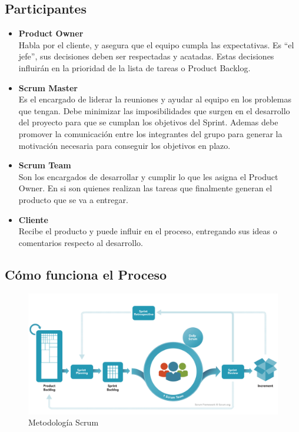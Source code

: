\subsection{Participantes}
\begin{itemize}
\item \textbf{Product Owner}\\
Habla por el cliente, y asegura que el equipo cumpla las expectativas. Es “el jefe”, sus decisiones deben ser
respectadas y acatadas. Estas  decisiones influirán en la prioridad de la lista de tareas o Product Backlog.



\item \textbf{Scrum Master}\\
Es el encargado de liderar la reuniones y ayudar al equipo en los problemas que tengan. Debe minimizar las imposibilidades que surgen en el desarrollo del proyecto para que se cumplan los objetivos del Sprint. Ademas debe promover la comunicación entre los integrantes del grupo para generar la motivación necesaria para conseguir los objetivos en plazo.




\item  \textbf{Scrum Team}\\
Son los encargados de desarrollar y cumplir lo que les asigna el Product Owner. En si son quienes realizan las tareas que finalmente generan el producto que se va a entregar.


\item  \textbf{Cliente}\\
Recibe el producto y puede influir en el proceso, entregando sus ideas o comentarios respecto al desarrollo.
\end{itemize}

\subsection{Cómo funciona el Proceso}



\begin{figure}[H]
		\centering
		\includegraphics[width=1.1\textwidth] {scrum.jpg}
		\caption{Metodología Scrum }
	\end{figure} 


